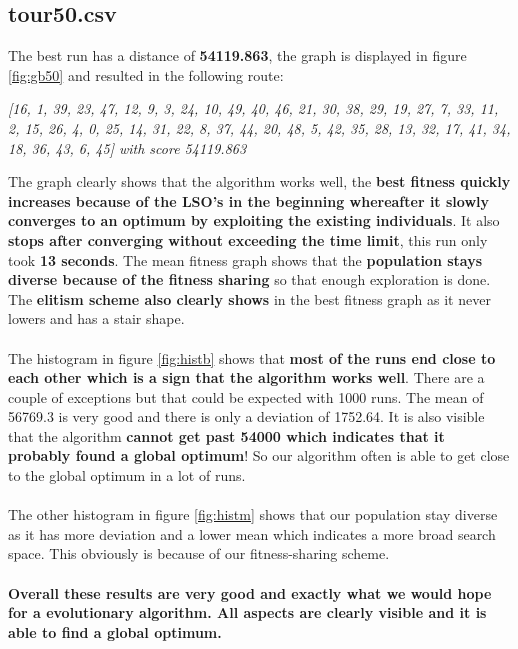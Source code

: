 \documentclass[a4paper,10pt]{article}
\begin{document}
\subsection{tour50.csv}
The best run has a distance of \textbf{54119.863}, the graph is displayed in figure \ref{fig:gb50} and resulted in the following route:
\begin{center}
\small
\textit{[16, 1, 39, 23, 47, 12, 9, 3, 24, 10, 49, 40, 46, 21, 30, 38, 29, 19, 27, 7, 33, 11, 2, 15, 26, 4, 0, 25, 14, 31, 22, 8, 37, 44, 20, 48, 5, 42, 35, 28, 13, 32, 17, 41, 34, 18, 36, 43, 6, 45] with score 54119.863}
\end{center}
The graph clearly shows that the algorithm works well, the \textbf{best fitness quickly increases because of the LSO's in the beginning whereafter it slowly converges to an optimum by exploiting the existing individuals}. It also \textbf{stops after converging without exceeding the time limit}, this run only took \textbf{13 seconds}. The mean fitness graph shows that the \textbf{population stays diverse because of the fitness sharing} so that enough exploration is done. The \textbf{elitism scheme also clearly shows} in the best fitness graph as it never lowers and has a stair shape.
\\\\
The histogram in figure \ref{fig:histb} shows that \textbf{most of the runs end close to each other which is a sign that the algorithm works well}. There are a couple of exceptions but that could be expected with 1000 runs. The mean of 56769.3 is very good and there is only a deviation of 1752.64. It is also visible that the algorithm \textbf{cannot get past 54000 which indicates that it probably found a global optimum}! So our algorithm often is able to get close to the global optimum in a lot of runs.
\\\\
The other histogram in figure \ref{fig:histm} shows that our population stay diverse as it has more deviation and a lower mean which indicates a more broad search space. This obviously is because of our fitness-sharing scheme.
\\\\
\textbf{Overall these results are very good and exactly what we would hope for a evolutionary algorithm. All aspects are clearly visible and it is able to find a global optimum.}
\end{document}
